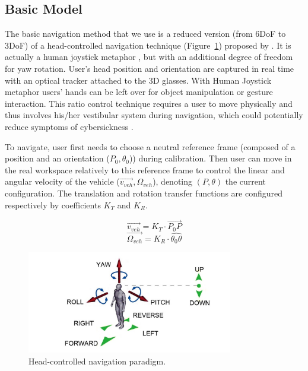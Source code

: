 \subsection{Basic Model}
The basic navigation method that we use is a reduced version (from 6DoF to 3DoF) of a head-controlled navigation technique (Figure~\ref{fig:4_hcnav}) proposed by \citet{Bourdot2002HCNav}. It is actually a human joystick metaphor \citep{McMahan2012EDF}, but with an additional degree of freedom for yaw rotation. User's head position and orientation are captured in real time with an optical tracker attached to the 3D glasses. With Human Joystick metaphor users' hands can be left over for object manipulation or gesture interaction. This ratio control technique requires a user to move physically and thus involves his/her vestibular system during navigation, which could potentially reduce symptoms of cybersickness \citep{Chen2013NVW}.

To navigate, user first needs to choose a neutral reference frame (composed of a position and an orientation ($P_{0}, \theta_{0}$)) during calibration. Then user can move in the real workspace relatively to this reference frame to control the linear and angular velocity of the vehicle ($\overrightarrow{v_{veh}}, \Omega_{veh}$), denoting $(P, \theta)$ the current configuration. The translation and rotation transfer functions are configured respectively by coefficients $K_{T}$ and $K_{R}$.

\begin{equation}
\overrightarrow{v_{veh}}=K_{T}\cdot \overrightarrow{P_{0}P}
\end{equation}
\begin{equation}
\overrightarrow{\Omega_{veh}}=K_{R}\cdot \widehat{\theta_{0}\theta}
\end{equation}

\begin{figure}[tb]
  \centering
  \includegraphics[width=0.8\textwidth]{figures/ch4/HCNav}
  \caption{\label{fig:4_hcnav}Head-controlled navigation paradigm.}
\end{figure}

